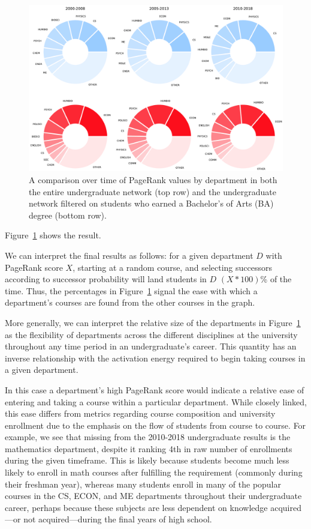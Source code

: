 \begin{figure}
    \centering
    \includegraphics[width=\columnwidth]{Figs/final-evolution.pdf}
    \caption{A comparison over time of PageRank values by department
      in both the entire undergraduate network (top row) and the
      undergraduate network filtered on students who earned a
      Bachelor's of Arts (BA) degree (bottom row).}
    \label{fig:evolution}
\end{figure}

Figure~\ref{fig:evolution} shows the result.

We can interpret the final results as follows: for a given department
$D$ with PageRank score $X$, starting at a random course, and
selecting successors according to successor probability will land
students in $D$ $(X * 100)$\% of the time. Thus, the percentages in
Figure~\ref{fig:evolution} signal the ease with which a department's
courses are found from the other courses in the graph.

More generally, we can interpret the relative size of the departments
in Figure~\ref{fig:evolution} as the flexibility of departments across
the different disciplines at the university throughout any time period
in an undergraduate's career. This quantity has an inverse
relationship with the activation energy required to begin taking
courses in a given department.

In this case a department's high PageRank score would indicate a
relative ease of entering and taking a course within a particular
department. While closely linked, this ease differs from metrics
regarding course composition and university enrollment due to the
emphasis on the flow of students from course to course. For example,
we see that missing from the 2010-2018 undergraduate results is the
mathematics department, despite it ranking 4th in raw number of
enrollments during the given timeframe. This is likely because
students become much less likely to enroll in math courses after
fulfilling the requirement (commonly during their freshman year),
whereas many students enroll in many of the popular courses in the CS,
ECON, and ME departments throughout their undergraduate career,
perhaps because these subjects are less dependent on knowledge
acquired---or not acquired---during the final years of high school.

